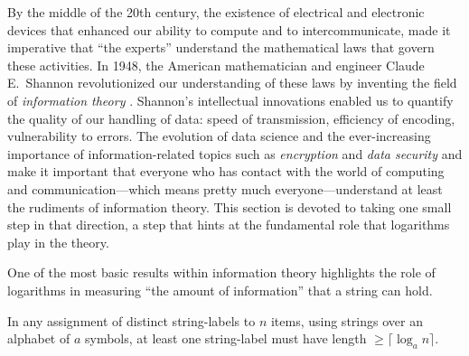  
   
By the middle of the 20th century, the existence of electrical and electronic devices that enhanced our ability to compute and to intercommunicate, made it imperative that ``the experts'' understand the mathematical laws that govern these activities.  In 1948, the American
mathematician and engineer Claude E.~Shannon revolutionized our understanding of these laws by inventing the field of {\it information theory}  \cite{Shannon48}.  Shannon's intellectual innovations enabled us to quantify the quality of our handling of data: speed of transmission, efficiency of encoding, vulnerability to errors.  The evolution of data science and the ever-increasing importance of information-related topics such as {\it encryption} and {\it data security} and make it important that everyone who has contact with the world of computing and communication---which means pretty much everyone---understand at least the rudiments of information theory.  This section is devoted to taking one small step in that direction, a step that hints at the fundamental role that logarithms play in the theory. 

\medskip

One of the most basic results within information theory highlights the role of logarithms in measuring ``the amount of information'' that a string can hold.

\begin{prop}
\label{thm:bound-stringnames-lgth-k}
In any assignment of distinct string-labels to $n$ items, using strings over an alphabet of $a$ symbols, at least one string-label must have length $\geq \lceil \log_a n \rceil$.
\end{prop}

